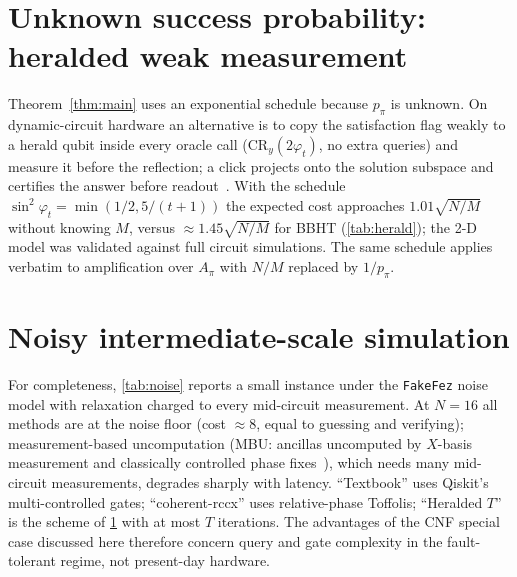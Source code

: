 \section{Unknown success probability: heralded weak measurement}\label{app:herald}
Theorem~\ref{thm:main} uses an exponential schedule because $p_\pi$ is unknown. On dynamic-circuit hardware an alternative is to copy the satisfaction flag weakly to a herald qubit inside every oracle call ($\mathrm{CR}_y(2\varphi_t)$, no extra queries) and measure it before the reflection; a click projects onto the solution subspace and certifies the answer before readout~\cite{mizel2009,andres2022,prabhat2026}. With the schedule $\sin^2\varphi_t=\min(1/2,5/(t+1))$ the expected cost approaches $1.01\sqrt{N/M}$ without knowing $M$, versus $\approx1.45\sqrt{N/M}$ for BBHT (\cref{tab:herald}); the 2-D model was validated against full circuit simulations. The same schedule applies verbatim to amplification over $A_\pi$ with $N/M$ replaced by $1/p_\pi$.


\section{Noisy intermediate-scale simulation}\label{app:noise}
For completeness, \cref{tab:noise} reports a small instance under the \texttt{FakeFez} noise model with relaxation charged to every mid-circuit measurement. At $N=16$ all methods are at the noise floor (cost $\approx8$, equal to guessing and verifying); measurement-based uncomputation (MBU: ancillas uncomputed by $X$-basis measurement and classically controlled phase fixes~\cite{gidney2018}), which needs many mid-circuit measurements, degrades sharply with latency. ``Textbook'' uses Qiskit's multi-controlled gates; ``coherent-rccx'' uses relative-phase Toffolis; ``Heralded $T$'' is the scheme of \cref{app:herald} with at most $T$ iterations. The advantages of the CNF special case discussed here therefore concern query and gate complexity in the fault-tolerant regime, not present-day hardware.

